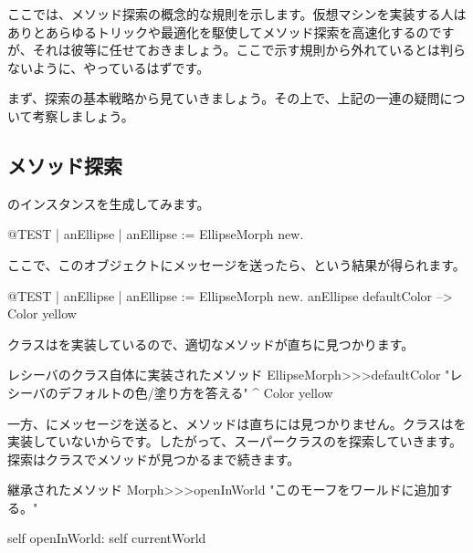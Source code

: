 \documentclass[a4paper,10pt,twoside]{book}
\begin{document}
ここでは、メソッド探索の概念的な規則を示します。仮想マシンを実装する人はありとあらゆるトリックや最適化を駆使してメソッド探索を高速化するのですが、それは彼等に任せておきましょう。ここで示す規則から外れているとは判らないように、やっているはずです。

まず、探索の基本戦略から見ていきましょう。その上で、上記の一連の疑問について考察しましょう。

\subsection{メソッド探索}
のインスタンスを生成してみます。
\begin{code}{@TEST | anEllipse |}
anEllipse := EllipseMorph new.
\end{code}
\noindent
ここで、このオブジェクトにメッセージを送ったら、という結果が得られます。
\begin{code}{@TEST | anEllipse | anEllipse := EllipseMorph new.}
anEllipse defaultColor --> Color yellow
\end{code}
\noindent
{}クラスはを実装しているので、適切なメソッドが直ちに見つかります。

\begin{method}[defaultColor]{レシーバのクラス自体に実装されたメソッド}
EllipseMorph>>>defaultColor
	"レシーバのデフォルトの色/塗り方を答える"
	^ Color yellow
\end{method}

一方、にメッセージを送ると、メソッドは直ちには見つかりません。クラスはを実装していないからです。したがって、スーパークラスのを探索していきます。探索はクラスでメソッドが見つかるまで続きます。

\begin{method}[openInWorld]{継承されたメソッド}
Morph>>>openInWorld
	"このモーフをワールドに追加する。"

	self openInWorld: self currentWorld
\end{method}
\end{document}
